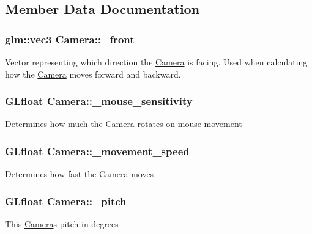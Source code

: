 \subsection{Member Data Documentation}
\subsubsection[{\texorpdfstring{\+\_\+front}{_front}}]{\setlength{\rightskip}{0pt plus 5cm}glm\+::vec3 Camera\+::\+\_\+front}\hypertarget{classCamera_ac610e748840c4b70c9081c2d68df2e8d}{}\label{classCamera_ac610e748840c4b70c9081c2d68df2e8d}
Vector representing which direction the \hyperlink{classCamera}{Camera} is facing. Used when calculating how the \hyperlink{classCamera}{Camera} moves forward and backward. 
\subsubsection[{\texorpdfstring{\+\_\+mouse\+\_\+sensitivity}{_mouse_sensitivity}}]{\setlength{\rightskip}{0pt plus 5cm}G\+Lfloat Camera\+::\+\_\+mouse\+\_\+sensitivity}\hypertarget{classCamera_aeb483d642e0bcf11aa881467ac9676fe}{}\label{classCamera_aeb483d642e0bcf11aa881467ac9676fe}
Determines how much the \hyperlink{classCamera}{Camera} rotates on mouse movement 
\subsubsection[{\texorpdfstring{\+\_\+movement\+\_\+speed}{_movement_speed}}]{\setlength{\rightskip}{0pt plus 5cm}G\+Lfloat Camera\+::\+\_\+movement\+\_\+speed}\hypertarget{classCamera_a6f31b5658310866d3228614a755b59b0}{}\label{classCamera_a6f31b5658310866d3228614a755b59b0}
Determines how fast the \hyperlink{classCamera}{Camera} moves 
\subsubsection[{\texorpdfstring{\+\_\+pitch}{_pitch}}]{\setlength{\rightskip}{0pt plus 5cm}G\+Lfloat Camera\+::\+\_\+pitch}\hypertarget{classCamera_a23a8b8859c44721d7082b89809318918}{}\label{classCamera_a23a8b8859c44721d7082b89809318918}
This \hyperlink{classCamera}{Camera}\textquotesingle{}s pitch in degrees 
